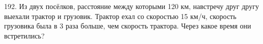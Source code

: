 192. Из двух посёлков, расстояние между которыми 120 км, навстречу друг другу выехали трактор и грузовик. Трактор ехал со скоростью 15 км/ч, скорость грузовика была в 3 раза больше, чем скорость трактора. Через какое время они встретились?\\
